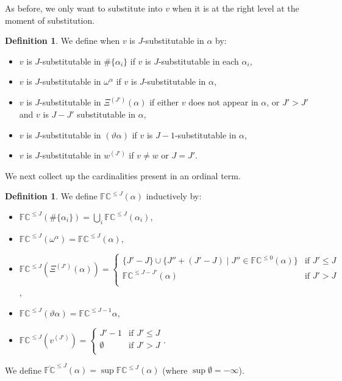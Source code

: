 \documentclass[11pt]{amsart}
\theoremstyle{definition}
\newtheorem{definition}[theorem]{Definition}
\begin{document}
As before, we only want to substitute into $v$ when it is at the right level at the moment of substitution.

\begin{definition}
  We define when $v$ is $J$-substitutable in $\alpha$ by:
  \begin{itemize}
  \item $v$ is $J$-substitutable in $\#\{\alpha_i\}$ if $v$ is $J$-substitutable in each $\alpha_i$,
  \item $v$ is $J$-substitutable in $\omega^\alpha$ if $v$ is $J$-substitutable in $\alpha$,
  \item $v$ is $J$-substitutable in $\Xi^{(J')}(\alpha)$ if either $v$ does not appear in $\alpha$, or $J'>J'$ and $v$ is $J-J'$ substitutable in $\alpha$,
  \item $v$ is $J$-substitutable in $(\vartheta\alpha)$ if $v$ is $J-1$-substitutable in $\alpha$,
  \item $v$ is $J$-substitutable in $w^{(J')}$ if $v\neq w$ or $J=J'$.
  \end{itemize}
\end{definition}

We next collect up the cardinalities present in an ordinal term. %

\begin{definition}
   We define $\mathbb{FC}^{\leq J}(\alpha)$ inductively by:
  \begin{itemize}
  \item $\mathbb{FC}^{\leq J}(\#\{\alpha_i\})=\bigcup_i\mathbb{FC}^{\leq J}(\alpha_i)$,
  \item $\mathbb{FC}^{\leq J}(\omega^\alpha)=\mathbb{FC}^{\leq J}(\alpha)$,
  \item $\mathbb{FC}^{\leq J}(\Xi^{(J')}(\alpha))=\left\{\begin{array}{ll}
                                                      \{J'-J\}\cup \{J''+(J'-J)\mid J''\in \mathbb{FC}^{\leq 0}(\alpha)\}&\text{if }J'\leq J\\
                                                      \mathbb{FC}^{\leq J-J'}(\alpha)&\text{if }J'>J\\
                                                    \end{array}\right.$,
  \item $\mathbb{FC}^{\leq J}(\vartheta\alpha)=\mathbb{FC}^{\leq J-1}\alpha$,
  \item $\mathbb{FC}^{\leq J}(v^{(J')})=\left\{\begin{array}{ll}
                                                      J'-1&\text{if }J'\leq J\\
                                                      \emptyset&\text{if }J'>J\\
                                                    \end{array}\right.$.
  \end{itemize}

  We define $\overline{\mathbb{FC}}^{\leq J}(\alpha)=\sup\mathbb{FC}^{\leq J}(\alpha)$ (where $\sup\emptyset=-\infty$).
\end{definition}
\end{document}
